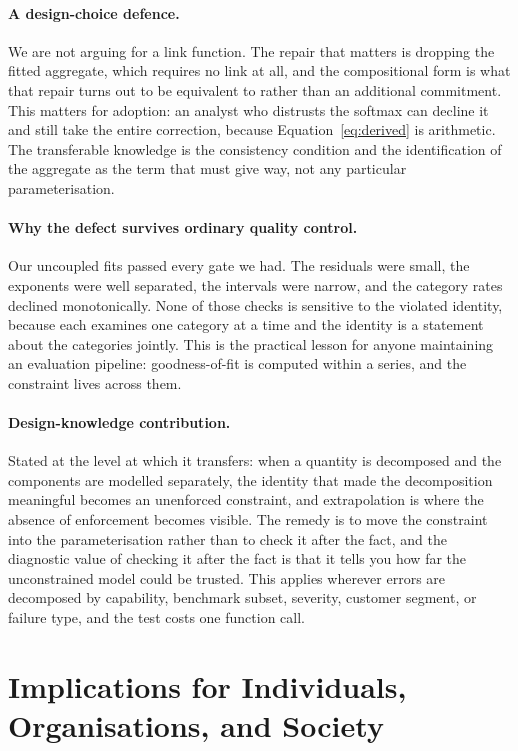 \documentclass[11pt]{article}
\begin{document}
\paragraph{A design-choice defence.}
We are not arguing for a link function. The repair that matters is dropping the
fitted aggregate, which requires no link at all, and the compositional form is what
that repair turns out to be equivalent to rather than an additional commitment. This
matters for adoption: an analyst who distrusts the softmax can decline it and still
take the entire correction, because Equation~\ref{eq:derived} is arithmetic. The
transferable knowledge is the consistency condition and the identification of the
aggregate as the term that must give way, not any particular parameterisation.

\paragraph{Why the defect survives ordinary quality control.}
Our uncoupled fits passed every gate we had. The residuals were small, the exponents
were well separated, the intervals were narrow, and the category rates declined
monotonically. None of those checks is sensitive to the violated identity, because
each examines one category at a time and the identity is a statement about the
categories jointly. This is the practical lesson for anyone maintaining an
evaluation pipeline: goodness-of-fit is computed within a series, and the constraint
lives across them.

\paragraph{Design-knowledge contribution.}
Stated at the level at which it transfers: when a quantity is decomposed and the
components are modelled separately, the identity that made the decomposition
meaningful becomes an unenforced constraint, and extrapolation is where the absence
of enforcement becomes visible. The remedy is to move the constraint into the
parameterisation rather than to check it after the fact, and the diagnostic value of
checking it after the fact is that it tells you how far the unconstrained model
could be trusted. This applies wherever errors are decomposed by capability,
benchmark subset, severity, customer segment, or failure type, and the test costs
one function call.

\section{Implications for Individuals, Organisations, and Society}
\label{sec:implications}
\end{document}
